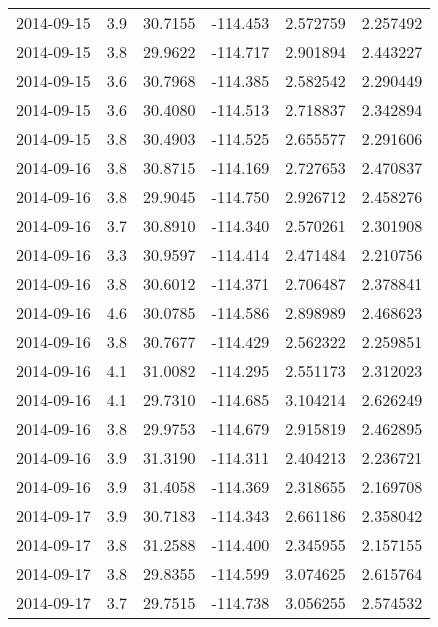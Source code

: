 \begin{tabular}{lrrrrr}
2014-09-15 &       3.9 &  30.7155 &  -114.453 &         2.572759 &         2.257492 \\
2014-09-15 &       3.8 &  29.9622 &  -114.717 &         2.901894 &         2.443227 \\
2014-09-15 &       3.6 &  30.7968 &  -114.385 &         2.582542 &         2.290449 \\
2014-09-15 &       3.6 &  30.4080 &  -114.513 &         2.718837 &         2.342894 \\
2014-09-15 &       3.8 &  30.4903 &  -114.525 &         2.655577 &         2.291606 \\
2014-09-16 &       3.8 &  30.8715 &  -114.169 &         2.727653 &         2.470837 \\
2014-09-16 &       3.8 &  29.9045 &  -114.750 &         2.926712 &         2.458276 \\
2014-09-16 &       3.7 &  30.8910 &  -114.340 &         2.570261 &         2.301908 \\
2014-09-16 &       3.3 &  30.9597 &  -114.414 &         2.471484 &         2.210756 \\
2014-09-16 &       3.8 &  30.6012 &  -114.371 &         2.706487 &         2.378841 \\
2014-09-16 &       4.6 &  30.0785 &  -114.586 &         2.898989 &         2.468623 \\
2014-09-16 &       3.8 &  30.7677 &  -114.429 &         2.562322 &         2.259851 \\
2014-09-16 &       4.1 &  31.0082 &  -114.295 &         2.551173 &         2.312023 \\
2014-09-16 &       4.1 &  29.7310 &  -114.685 &         3.104214 &         2.626249 \\
2014-09-16 &       3.8 &  29.9753 &  -114.679 &         2.915819 &         2.462895 \\
2014-09-16 &       3.9 &  31.3190 &  -114.311 &         2.404213 &         2.236721 \\
2014-09-16 &       3.9 &  31.4058 &  -114.369 &         2.318655 &         2.169708 \\
2014-09-17 &       3.9 &  30.7183 &  -114.343 &         2.661186 &         2.358042 \\
2014-09-17 &       3.8 &  31.2588 &  -114.400 &         2.345955 &         2.157155 \\
2014-09-17 &       3.8 &  29.8355 &  -114.599 &         3.074625 &         2.615764 \\
2014-09-17 &       3.7 &  29.7515 &  -114.738 &         3.056255 &         2.574532 \\

\end{tabular}
